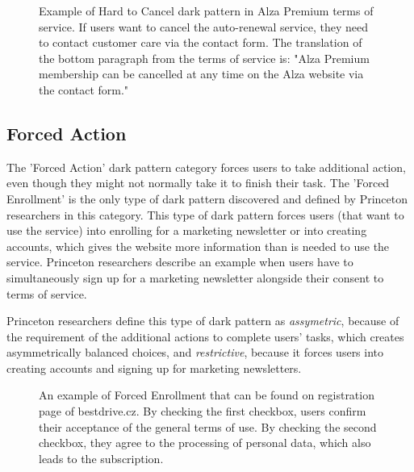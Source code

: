     \begin{figure}[ht]
        \centering
        \caption{Example of Hard to Cancel dark pattern in Alza Premium terms of service. If users want to cancel the auto-renewal service, they need to contact customer care via the contact form. The translation of the bottom paragraph from the terms of service is: "Alza Premium membership can be cancelled at any time on the Alza website via the contact form."}
        \label{fig:hard-to-cancel-alza}
    \end{figure}

    \subsection{Forced Action}
    The 'Forced Action' dark pattern category forces users to take additional action, even though they might not normally take it to finish their task. The 'Forced Enrollment' is the only type of dark pattern discovered and defined by Princeton researchers in this category. This type of dark pattern forces users (that want to use the service) into enrolling for a marketing newsletter or into creating accounts, which gives the website more information than is needed to use the service. Princeton researchers describe an example when users have to simultaneously sign up for a marketing newsletter alongside their consent to terms of service.

    Princeton researchers define this type of dark pattern as \emph{assymetric}, because of the requirement of the additional actions to complete users' tasks, which creates asymmetrically balanced choices, and \emph{restrictive}, because it forces users into creating accounts and signing up for marketing newsletters.

    \begin{figure}[ht]
        \centering
        \caption{An example of Forced Enrollment that can be found on registration page of bestdrive.cz. By checking the first checkbox, users confirm their acceptance of the general terms of use. By checking the second checkbox, they agree to the processing of personal data, which also leads to the subscription.}
        \label{fig:forced-enrollment-datart}
    \end{figure}

